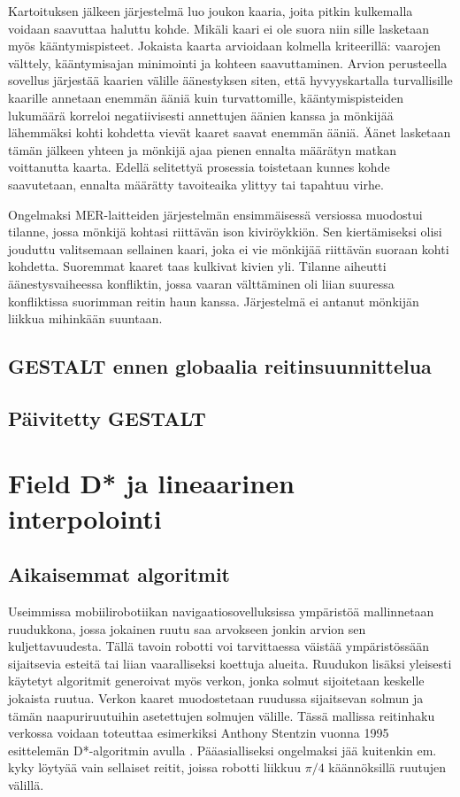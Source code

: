 \documentclass[finnish]{tktltiki2}
\theoremstyle{definition}
\theoremstyle{remark}
\begin{document}
Kartoituksen jälkeen järjestelmä luo joukon kaaria, joita pitkin kulkemalla voidaan saavuttaa haluttu kohde. Mikäli kaari ei ole suora niin sille lasketaan myös kääntymispisteet. Jokaista kaarta arvioidaan kolmella kriteerillä: vaarojen välttely, kääntymisajan minimointi ja kohteen saavuttaminen. Arvion perusteella sovellus järjestää kaarien välille äänestyksen siten, että hyvyyskartalla turvallisille kaarille annetaan enemmän ääniä kuin turvattomille, kääntymispisteiden lukumäärä korreloi negatiivisesti annettujen äänien kanssa ja mönkijää lähemmäksi kohti kohdetta vievät kaaret saavat enemmän ääniä. Äänet lasketaan tämän jälkeen yhteen ja mönkijä ajaa pienen ennalta määrätyn matkan voittanutta kaarta. Edellä selitettyä prosessia toistetaan kunnes kohde saavutetaan, ennalta määrätty tavoiteaika ylittyy tai tapahtuu virhe.

Ongelmaksi MER-laitteiden järjestelmän ensimmäisessä versiossa muodostui tilanne, jossa mönkijä kohtasi riittävän ison kiviröykkiön. Sen kiertämiseksi olisi jouduttu valitsemaan sellainen kaari, joka ei vie mönkijää riittävän suoraan kohti kohdetta. Suoremmat kaaret taas kulkivat kivien yli. Tilanne aiheutti äänestysvaiheessa konfliktin, jossa vaaran välttäminen oli liian suuressa konfliktissa suorimman reitin haun kanssa. Järjestelmä ei antanut mönkijän liikkua mihinkään suuntaan.

\subsection{GESTALT ennen globaalia reitinsuunnittelua}
\subsection{Päivitetty GESTALT}
\section{Field D* ja lineaarinen interpolointi}

\subsection{Aikaisemmat algoritmit}
Useimmissa mobiilirobotiikan navigaatiosovelluksissa ympäristöä mallinnetaan ruudukkona, jossa jokainen ruutu saa arvokseen jonkin arvion sen kuljettavuudesta. Tällä tavoin robotti voi tarvittaessa väistää ympäristössään sijaitsevia esteitä tai liian vaaralliseksi koettuja alueita. Ruudukon lisäksi yleisesti käytetyt algoritmit generoivat myös verkon, jonka solmut sijoitetaan keskelle jokaista ruutua. Verkon kaaret muodostetaan ruudussa sijaitsevan solmun ja tämän naapuriruutuihin asetettujen solmujen välille. Tässä mallissa reitinhaku verkossa voidaan toteuttaa esimerkiksi Anthony Stentzin vuonna 1995 esittelemän D*-algoritmin avulla \cite{stentz1995focussed}. Pääasialliseksi ongelmaksi jää kuitenkin em. kyky löytyää vain sellaiset reitit, joissa robotti liikkuu $\pi/4$ käännöksillä ruutujen välillä.
\end{document}

